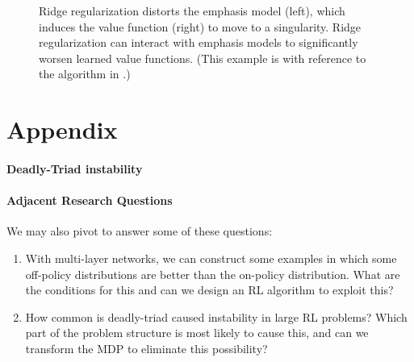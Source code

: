 \documentclass[11pt]{article}
\begin{document}
\begin{figure}
    
    \caption{Ridge regularization distorts the emphasis model (left), which induces the value function (right) to move to a singularity. Ridge regularization can interact with emphasis models to significantly worsen learned value functions. (This example is with reference to the algorithm in \citep{zhang2021breaking}.) }
    \label{fig:emphasisplots}
\end{figure}

\clearpage

\appendix
\section*{Appendix }

\paragraph{Deadly-Triad instability}


\paragraph{Adjacent Research Questions}
We may also pivot to answer some of these questions:

\begin{enumerate}
    \item With multi-layer networks, we can construct some examples in which some off-policy distributions are better than the on-policy distribution. What are the conditions for this and can we design an RL algorithm to exploit this?
    \item How common is deadly-triad caused instability in large RL problems? Which part of the problem structure is most likely to cause this, and can we transform the MDP to eliminate this possibility?
\end{enumerate}


\clearpage

% 

\end{document}
